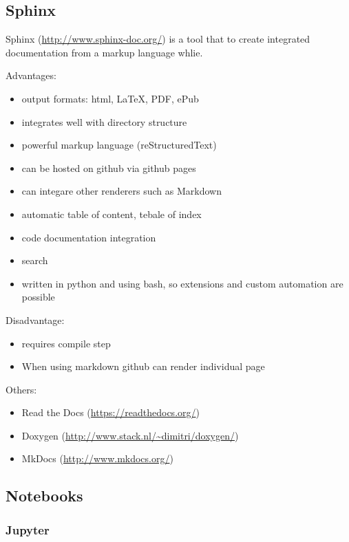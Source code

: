 \subsection{Sphinx}\label{sphinx}

Sphinx (\url{http://www.sphinx-doc.org/}) is a tool that to create
integrated documentation from a markup language whlie.

Advantages:

\begin{itemize}
\tightlist
\item
  output formats: html, LaTeX, PDF, ePub
\item
  integrates well with directory structure
\item
  powerful markup language (reStructuredText)
\item
  can be hosted on github via github pages
\item
  can integare other renderers such as Markdown
\item
  automatic table of content, tebale of index
\item
  code documentation integration
\item
  search
\item
  written in python and using bash, so extensions and custom automation
  are possible
\end{itemize}

Disadvantage:

\begin{itemize}
\tightlist
\item
  requires compile step
\item
  When using markdown github can render individual page
\end{itemize}

Others:

\begin{itemize}
\tightlist
\item
  Read the Docs (\url{https://readthedocs.org/})
\item
  Doxygen (\url{http://www.stack.nl/~dimitri/doxygen/})
\item
  MkDocs (\url{http://www.mkdocs.org/})
\end{itemize}

\subsection{Notebooks}\label{notebooks}

\subsubsection{Jupyter}\label{jupyter}

